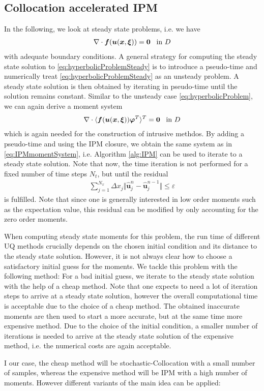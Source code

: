 \subsection{Collocation accelerated IPM}
\label{sec:collIPM}

In the following, we look at steady state problems, i.e. we have
\begin{align}\label{eq:hyperbolicProblemSteady}
\nabla\cdot\bm{f}(\bm{u}(\bm{x},\bm{\xi})) = \bm{0} \enskip \text{ in } D
\end{align}
with adequate boundary conditions. A general strategy for computing the steady state solution to \eqref{eq:hyperbolicProblemSteady} is to introduce a pseudo-time and numerically treat \eqref{eq:hyperbolicProblemSteady} as an unsteady problem. A steady state solution is then obtained by iterating in pseudo-time until the solution remains constant.
Similar to the unsteady case \eqref{eq:hyperbolicProblem}, we can again derive a moment system 
\begin{align}\label{eq:MomentSystemSteady}
\nabla\cdot\langle\bm{f}(\bm{u}(\bm{x},\bm{\xi}))\bm{\varphi}^T\rangle^T = \bm{0} \enskip \text{ in } D
\end{align}
which is again needed for the construction of intrusive methdos. By adding a pseudo-time and using the IPM closure, we obtain the same system as in \eqref{eq:IPMmomentSystem}, i.e. Algorithm \ref{alg:IPM} can be used to iterate to a steady state solution. Note that now, the time iteration is not performed for a fixed number of time steps $N_t$, but until the residual
\begin{align*}
\sum_{j = 1}^{N_x} \Delta x_j \Vert \bm{\hat{u}}_j^n - \bm{\hat{u}}_j^{n-1} \Vert \leq \varepsilon
\end{align*}
is fulfilled. Note that since one is generally interested in low order moments such as the expectation value, this residual can be modified by only accounting for the zero order moments.

When computing steady state moments for this problem, the run time of different UQ methods crucially depends on the chosen initial condition and its distance to the steady state solution. However, it is not always clear how to choose a satisfactory initial guess for the moments. We tackle this problem with the following method: For a bad initial guess, we iterate to the steady state solution with the help of a cheap method. Note that one expects to need a lot of iteration steps to arrive at a steady state solution, however the overall computational time is acceptable due to the choice of a cheap method. The obtained inaccurate moments are then used to start a more accurate, but at the same time more expensive method. Due to the choice of the initial condition, a smaller number of iterations is needed to arrive at the steady state solution of the expensive method, i.e. the numerical costs are again acceptable.

I our case, the cheap method will be stochastic-Collocation with a small number of samples, whereas the expensive method will be IPM with a high number of moments. However different variants of the main idea can be applied: